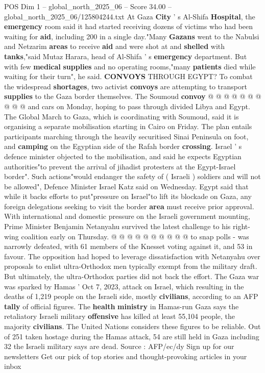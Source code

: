 \begin{textsample}{POS Dim 1 – global\_north\_2025\_06 – Score 34.00 – global\_north\_2025\_06/125804244.txt}
At Gaza \textbf{City} ' s Al-Shifa \textbf{Hospital}, the \textbf{emergency} room said it had started receiving dozens of victims who had been waiting for \textbf{aid}, including 200 in a single day."Many \textbf{Gazans} went to the Nabulsi and Netzarim \textbf{areas} to receive \textbf{aid} and were shot at and \textbf{shelled} with \textbf{tanks},"said Mutaz Harara, head of Al-Shifa ' s \textbf{emergency} department.
But with few \textbf{medical} \textbf{supplies} and no operating rooms,"many \textbf{patients} died while waiting for their turn", he said. \textbf{CONVOYS} THROUGH EGYPT?
To combat the widespread \textbf{shortages}, two activist \textbf{convoys} are attempting to transport \textbf{supplies} to the Gaza border themselves.
The Soumoud \textbf{convoy} @ @ @ @ @ @ @ @ @ @ and cars on Monday, hoping to pass through divided Libya and Egypt.
The Global March to Gaza, which is coordinating with Soumoud, said it is organising a separate mobilisation starting in Cairo on Friday.
The plan entails participants marching through the heavily securitised Sinai Peninsula on foot, and \textbf{camping} on the Egyptian side of the Rafah border \textbf{crossing}.
Israel ' s defence minister objected to the mobilisation, and said he expects Egyptian authorities"to prevent the arrival of jihadist protesters at the Egypt-Israel border".
Such actions"would endanger the safety of ( Israeli ) soldiers and will not be allowed", Defence Minister Israel Katz said on Wednesday.
Egypt said that while it backs efforts to put"pressure on Israel"to lift its blockade on Gaza, any foreign delegations seeking to visit the border \textbf{area} must receive prior approval.
With international and domestic pressure on the Israeli government mounting, Prime Minister Benjamin Netanyahu survived the latest challenge to his right-wing coalition early on Thursday. @ @ @ @ @ @ @ @ @ @ to snap polls - was narrowly defeated, with 61 members of the Knesset voting against it, and 53 in favour.
The opposition had hoped to leverage dissatisfaction with Netanyahu over proposals to enlist ultra-Orthodox men typically exempt from the military draft.
But ultimately, the ultra-Orthodox parties did not back the effort.
The Gaza war was sparked by Hamas ' Oct 7, 2023, attack on Israel, which resulting in the deaths of 1,219 people on the Israeli side, mostly \textbf{civilians}, according to an AFP \textbf{tally} of official figures.
The \textbf{health} \textbf{ministry} in Hamas-run Gaza says the retaliatory Israeli military \textbf{offensive} has killed at least 55,104 people, the majority \textbf{civilians}.
The United Nations considers these figures to be reliable.
Out of 251 taken hostage during the Hamas attack, 54 are still held in Gaza including 32 the Israeli military says are dead.
Source : AFP/ec/dy Sign up for our newsletters Get our pick of top stories and thought-provoking articles in your inbox


\end{textsample}
